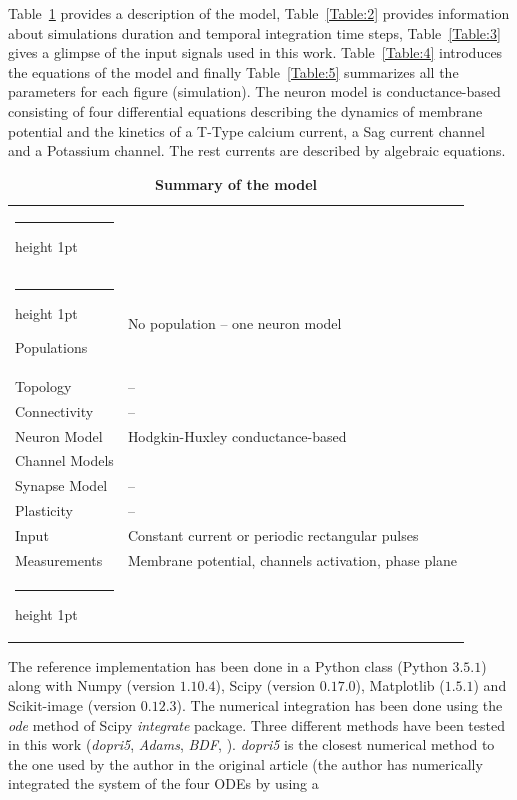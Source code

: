 \documentclass[10pt,a4paper,onecolumn]{article}
\makeatletter
\newcommand{\thickhline}{%
    \noalign {\ifnum 0=`}\fi \hrule height 1pt
    \futurelet \reserved@a \@xhline
}
\makeatother
\begin{document}
Table~\ref{Table:1} provides a description of the model, Table~\ref{Table:2}
provides information about simulations duration and temporal integration time
steps, Table~\ref{Table:3} gives a glimpse of the input signals used in this work.
Table~\ref{Table:4} introduces the equations of the model and finally 
Table~\ref{Table:5} summarizes all the parameters for each figure (simulation).
The neuron model is conductance-based consisting of four differential equations
describing the dynamics of membrane potential and the kinetics of a T-Type
calcium current, a Sag current channel and a Potassium channel. The rest
currents are described by algebraic equations.
\begin{table}[!htbp]
    \centering
    \begin{tabular}{ll}
        \thickhline
        \multicolumn{2}{c}{Model Summary} \\\thickhline
        \rowcolor{Gray}
        Populations  & No population -- one neuron model \\\rowcolor{LightGray}
        Topology     & -- \\ \rowcolor{Gray}
        Connectivity & -- \\ \rowcolor{LightGray}
        Neuron Model & Hodgkin-Huxley conductance-based \\\rowcolor{Gray}
        Channel Models & \\ \rowcolor{LightGray}
        Synapse Model & -- \\ \rowcolor{Gray}
        Plasticity & -- \\ \rowcolor{LightGray}
        Input & Constant current or periodic rectangular pulses \\\rowcolor{Gray}
        Measurements & Membrane potential, channels activation, phase plane \\
        \thickhline
    \end{tabular}
    \caption{{\bfseries \sffamily Summary of the model}} 
    \label{Table:1}
\end{table}
The reference implementation has been done in a Python class (Python $3.5.1$)
along with Numpy (version $1.10.4$), Scipy (version $0.17.0$), Matplotlib
($1.5.1$) and Scikit-image (version $0.12.3$). The numerical integration
has been done using the \emph{ode} method of Scipy \emph{integrate} package.
Three different methods have been tested in this work (\emph{dopri5}, 
\emph{Adams}, \emph{BDF}, \cite{ascher:1998}). \emph{dopri5} is the closest
numerical method to the one used by the author in the original article (the
author has numerically integrated the system of the four ODEs by using a
\end{document}
